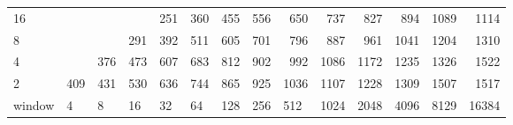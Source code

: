 \begin{table}[]
{\begin{tabular}{lrrrrrrrrrrrrr}
			\multicolumn{1}{|l|}{16} &  &  &  & \cellcolor[HTML]{99E600}251 & \cellcolor[HTML]{99E600}360 & \cellcolor[HTML]{E69900}455 & \cellcolor[HTML]{E69900}556 & \cellcolor[HTML]{E69900}650 & \cellcolor[HTML]{E60000}737 & \cellcolor[HTML]{E60000}827 & \cellcolor[HTML]{E60000}894 & \cellcolor[HTML]{9900E6}1089 & \cellcolor[HTML]{9900E6}1114 \\ \cline{1-1}
			\multicolumn{1}{|l|}{8} &  &  & \cellcolor[HTML]{99E600}291 & \cellcolor[HTML]{99E600}392 & \cellcolor[HTML]{E69900}511 & \cellcolor[HTML]{E69900}605 & \cellcolor[HTML]{E69900}701 & \cellcolor[HTML]{E60000}796 & \cellcolor[HTML]{E60000}887 & \cellcolor[HTML]{E60000}961 & \cellcolor[HTML]{9900E6}1041 & \cellcolor[HTML]{9900E6}1204 & \cellcolor[HTML]{4C00E6}1310 \\ \cline{1-1}
			\multicolumn{1}{|l|}{4} &  & \cellcolor[HTML]{99E600}376 & \cellcolor[HTML]{99E600}473 & \cellcolor[HTML]{E69900}607 & \cellcolor[HTML]{E69900}683 & \cellcolor[HTML]{E60000}812 & \cellcolor[HTML]{E60000}902 & \cellcolor[HTML]{9900E6}992 & \cellcolor[HTML]{9900E6}1086 & \cellcolor[HTML]{9900E6}1172 & \cellcolor[HTML]{9900E6}1235 & \cellcolor[HTML]{4C00E6}1326 & \cellcolor[HTML]{4C00E6}1522 \\ \cline{1-1}
			\multicolumn{1}{|l|}{2} & \cellcolor[HTML]{99E600}409 & \cellcolor[HTML]{99E600}431 & \cellcolor[HTML]{E69900}530 & \cellcolor[HTML]{E69900}636 & \cellcolor[HTML]{E60000}744 & \cellcolor[HTML]{E60000}865 & \cellcolor[HTML]{E60000}925 & \cellcolor[HTML]{9900E6}1036 & \cellcolor[HTML]{9900E6}1107 & \cellcolor[HTML]{9900E6}1228 & \cellcolor[HTML]{4C00E6}1309 & \cellcolor[HTML]{4C00E6}1507 & \cellcolor[HTML]{4C00E6}1517 \\ \cline{1-1}
			\multicolumn{1}{l|}{window} & \multicolumn{1}{l|}{4} & \multicolumn{1}{l|}{8} & \multicolumn{1}{l|}{16} & \multicolumn{1}{l|}{32} & \multicolumn{1}{l|}{64} & \multicolumn{1}{l|}{128} & \multicolumn{1}{l|}{256} & \multicolumn{1}{l|}{512} & \multicolumn{1}{l|}{1024} & \multicolumn{1}{l|}{2048} & \multicolumn{1}{l|}{4096} & \multicolumn{1}{l|}{8129} & \multicolumn{1}{l|}{16384} \\ \cline{2-14}
		\end{tabular}
	}
\end{table}










